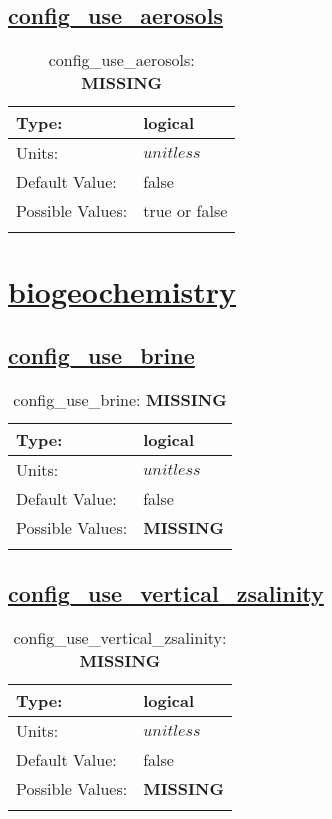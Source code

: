 \subsection[config\_use\_aerosols]{\hyperref[sec:nm_tab_column_tracers]{config\_use\_aerosols}}
\label{subsec:nm_sec_config_use_aerosols}
\begin{center}
\begin{longtable}{| p{2.0in} || p{4.0in} |}
    \hline
    Type: & logical \\
    \hline
    Units: & $unitless$ \\
    \hline
    Default Value: & false \\
    \hline
    Possible Values: & true or false \\
    \hline
    \caption{config\_use\_aerosols: {\bf \color{red} MISSING}}
\end{longtable}
\end{center}
\section[biogeochemistry]{\hyperref[sec:nm_tab_biogeochemistry]{biogeochemistry}}
\label{sec:nm_sec_biogeochemistry}
\subsection[config\_use\_brine]{\hyperref[sec:nm_tab_biogeochemistry]{config\_use\_brine}}
\label{subsec:nm_sec_config_use_brine}
\begin{center}
\begin{longtable}{| p{2.0in} || p{4.0in} |}
    \hline
    Type: & logical \\
    \hline
    Units: & $unitless$ \\
    \hline
    Default Value: & false \\
    \hline
    Possible Values: & {\bf \color{red} MISSING} \\
    \hline
    \caption{config\_use\_brine: {\bf \color{red} MISSING}}
\end{longtable}
\end{center}
\subsection[config\_use\_vertical\_zsalinity]{\hyperref[sec:nm_tab_biogeochemistry]{config\_use\_vertical\_zsalinity}}
\label{subsec:nm_sec_config_use_vertical_zsalinity}
\begin{center}
\begin{longtable}{| p{2.0in} || p{4.0in} |}
    \hline
    Type: & logical \\
    \hline
    Units: & $unitless$ \\
    \hline
    Default Value: & false \\
    \hline
    Possible Values: & {\bf \color{red} MISSING} \\
    \hline
    \caption{config\_use\_vertical\_zsalinity: {\bf \color{red} MISSING}}
\end{longtable}
\end{center}

